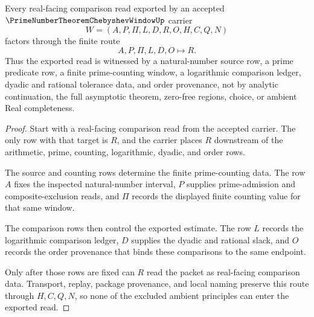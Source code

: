 \begin{theorem}
\label{thm:prime-number-theorem-chebyshev-window-route}
Every real-facing comparison read exported by an accepted $\PrimeNumberTheoremChebyshevWindowUp$ carrier
$$
W=(A,P,\Pi,L,D,R,O,H,C,Q,N)
$$
factors through the finite route
$$
A,P,\Pi,L,D,O \longmapsto R .
$$
Thus the exported read is witnessed by a natural-number source row, a prime predicate row, a finite prime-counting window, a logarithmic comparison ledger, dyadic and rational tolerance data, and order provenance, not by analytic continuation, the full asymptotic theorem, zero-free regions, choice, or ambient Real completeness.
\end{theorem}
\begin{proof}
Start with a real-facing comparison read from the accepted carrier. The only row with that target is $R$, and the carrier places $R$ downstream of the arithmetic, prime, counting, logarithmic, dyadic, and order rows.

The source and counting rows determine the finite prime-counting data. The row $A$ fixes the inspected natural-number interval, $P$ supplies prime-admission and composite-exclusion reads, and $\Pi$ records the displayed finite counting value for that same window.

The comparison rows then control the exported estimate. The row $L$ records the logarithmic comparison ledger, $D$ supplies the dyadic and rational slack, and $O$ records the order provenance that binds these comparisons to the same endpoint.

Only after those rows are fixed can $R$ read the packet as real-facing comparison data. Transport, replay, package provenance, and local naming preserve this route through $H,C,Q,N$, so none of the excluded ambient principles can enter the exported read.
\end{proof}



